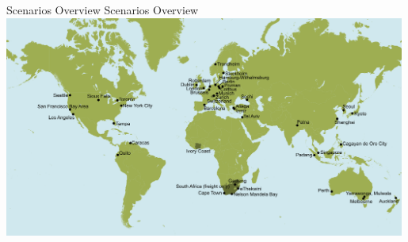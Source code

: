 \createfigure%
{Scenarios Overview}%
{Scenarios Overview}%
{\label{fig:scenarios}}%
{\includegraphics[width=0.99\textwidth, angle=0]{using/figures/MATSimModelsMap}}%
{}

\clearpage
 \clearpage

 \clearpage

 \clearpage

 \clearpage

 \clearpage

 \clearpage

 \clearpage

 \clearpage

 \clearpage

